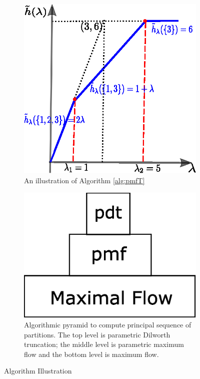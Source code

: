 \documentclass{article}
\begin{document}
\begin{figure}
	\centering
	\begin{subfigure}{0.4\textwidth}
		\includegraphics[width=\textwidth]{pic/example_pst_single.eps}
		\caption{An illustration of Algorithm \ref{alg:pmfT}}\label{fig:linseg}
	\end{subfigure}
	\begin{subfigure}{0.4\textwidth}
		\includegraphics[width=\textwidth]{pic/pdt.eps}
		\caption{Algorithmic pyramid to compute principal sequence of partitions. The top level is parametric Dilworth truncation; the middle level is parametric maximum flow and the bottom level is maximum flow.}\label{fig:pyramid}
	\end{subfigure}
	\caption{Algorithm Illustration}
\end{figure}
\end{document}
